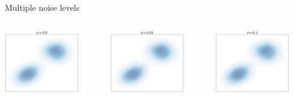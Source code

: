 \documentclass[aspectratio=169,xcolor=dvipsnames]{beamer}
\begin{document}
\begin{frame}{Multiple noise levels}

  \begin{columns}
    \begin{column}{0.32\textwidth}
      \includegraphics[width=0.8\textwidth]{figs/gen/mixture_with_noise_0.0.png}
    \end{column}
      \begin{column}{0.32\textwidth}
      \includegraphics[width=0.8\textwidth]{figs/gen/mixture_with_noise_0.01.png}
    \end{column}
    \begin{column}{0.32\textwidth}
      \includegraphics[width=0.8\textwidth]{figs/gen/mixture_with_noise_0.1.png}

\end{column}
\end{columns}
\end{frame}
\end{document}
